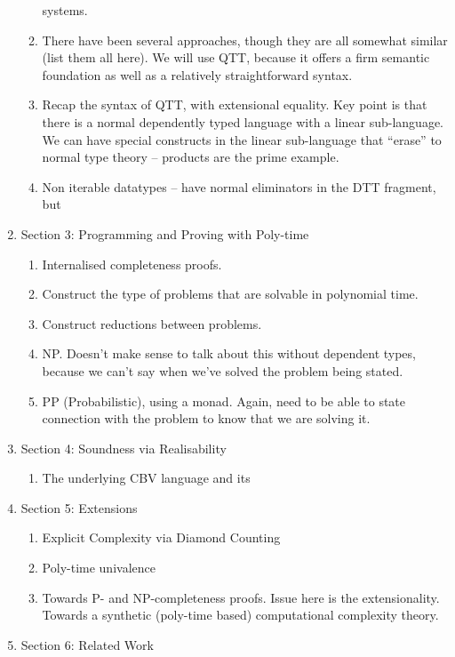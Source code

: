\documentclass[acmsmall,review]{acmart}
\begin{document}
\begin{enumerate}
\begin{enumerate}
    systems.
  \item There have been several approaches, though they are all
    somewhat similar (list them all here). We will use QTT, because it
    offers a firm semantic foundation as well as a relatively
    straightforward syntax.
  \item Recap the syntax of QTT, with extensional equality. Key point
    is that there is a normal dependently typed language with a linear
    sub-language. We can have special constructs in the linear
    sub-language that ``erase'' to normal type theory -- products are
    the prime example.
  \item Non iterable datatypes -- have normal eliminators in the DTT
    fragment, but
  \end{enumerate}
\item Section 3: Programming and Proving with Poly-time
  \begin{enumerate}
  \item Internalised completeness proofs.
  \item Construct the type of problems that are solvable in polynomial
    time.
  \item Construct reductions between problems.
  \item NP. Doesn't make sense to talk about this without dependent
    types, because we can't say when we've solved the problem being
    stated.
  \item PP (Probabilistic), using a monad. Again, need to be able to
    state connection with the problem to know that we are solving it.
  \end{enumerate}
\item Section 4: Soundness via Realisability
  \begin{enumerate}
  \item The underlying CBV language and its
  \end{enumerate}
\item Section 5: Extensions
  \begin{enumerate}
  \item Explicit Complexity via Diamond Counting
  \item Poly-time univalence
  \item Towards P- and NP-completeness proofs. Issue here is the
    extensionality. Towards a synthetic (poly-time based)
    computational complexity theory.
  \end{enumerate}
\item Section 6: Related Work
  \begin{enumerate}

\end{enumerate}
\end{enumerate}
\end{document}
